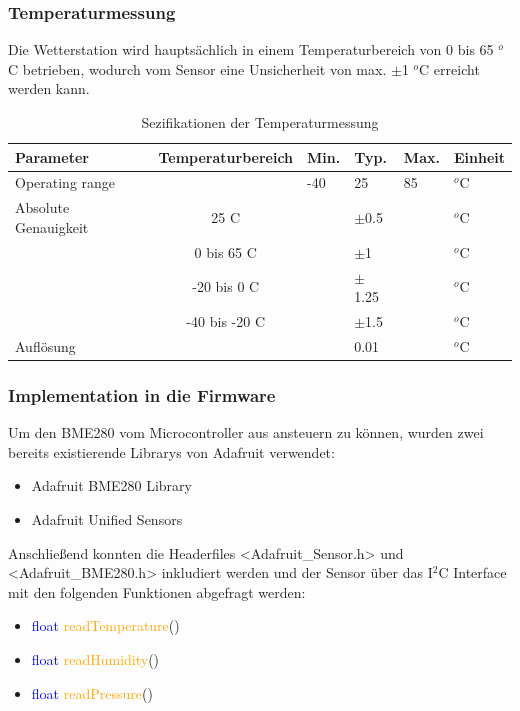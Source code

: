 \subsubsection*{Temperaturmessung}
Die Wetterstation wird hauptsächlich in einem Temperaturbereich von 0 bis 65 $^{o}$C betrieben, wodurch vom Sensor eine Unsicherheit von max. $\pm$1 $^{o}$C erreicht werden kann. \\
\begin{table}[htbp]
  \centering
  \caption{Sezifikationen der Temperaturmessung \cite{Bosch2019}}
    \begin{tabular}{llllll}
    \toprule
    \textbf{Parameter} & \multicolumn{1}{l}{\textbf{Temperaturbereich}} & \multicolumn{1}{l}{\textbf{Min.}} & \textbf{Typ. } & \multicolumn{1}{l}{\textbf{Max.}} & \textbf{Einheit} \\
    \midrule
    Operating range &       & \multicolumn{1}{l}{-40} & 25    & \multicolumn{1}{l}{85} & $^{o}$C \\
    Absolute Genauigkeit & \multicolumn{1}{c}{25 C} &       & $\pm$0.5 &       & $^{o}$C \\
          & \multicolumn{1}{c}{0 bis 65 C} &       & $\pm$1  &       & $^{o}$C \\
          & \multicolumn{1}{c}{-20 bis 0 C} &       & $\pm$1.25 &       & $^{o}$C \\
          & \multicolumn{1}{c}{-40 bis -20 C} &       & $\pm$1.5 &       & $^{o}$C \\
    Auflösung  &       &       & 0.01  &       & $^{o}$C \\
    \bottomrule
    \end{tabular}%
  \label{tab:spez_temp}%
\end{table}%

\subsubsection*{Implementation in die Firmware}
Um den BME280 vom Microcontroller aus ansteuern zu können, wurden zwei bereits existierende Librarys von Adafruit verwendet:
\begin{itemize}
\item Adafruit BME280 Library
\item Adafruit Unified Sensors
\end{itemize}
Anschließend konnten die Headerfiles <Adafruit\_Sensor.h> und <Adafruit\_BME280.h> inkludiert werden und der Sensor über das I$^{2}$C Interface mit den folgenden Funktionen abgefragt werden:\\
\begin{itemize}
\item \textcolor{blue}{float} \textcolor{orange}{readTemperature}()
\item \textcolor{blue}{float} \textcolor{orange}{readHumidity}()
\item \textcolor{blue}{float} \textcolor{orange}{readPressure}()
\end{itemize}